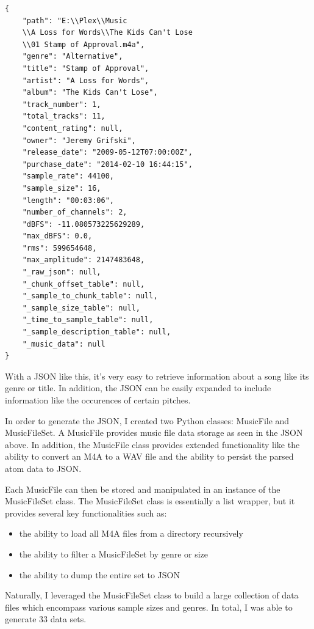 \documentclass[journal]{vgtc}                %
\begin{document}
\begin{verbatim}
{
    "path": "E:\\Plex\\Music
    \\A Loss for Words\\The Kids Can't Lose
    \\01 Stamp of Approval.m4a",
    "genre": "Alternative",
    "title": "Stamp of Approval",
    "artist": "A Loss for Words",
    "album": "The Kids Can't Lose",
    "track_number": 1,
    "total_tracks": 11,
    "content_rating": null,
    "owner": "Jeremy Grifski",
    "release_date": "2009-05-12T07:00:00Z",
    "purchase_date": "2014-02-10 16:44:15",
    "sample_rate": 44100,
    "sample_size": 16,
    "length": "00:03:06",
    "number_of_channels": 2,
    "dBFS": -11.080573225629289,
    "max_dBFS": 0.0,
    "rms": 599654648,
    "max_amplitude": 2147483648,
    "_raw_json": null,
    "_chunk_offset_table": null,
    "_sample_to_chunk_table": null,
    "_sample_size_table": null,
    "_time_to_sample_table": null,
    "_sample_description_table": null,
    "_music_data": null
}
\end{verbatim}

With a JSON like this, it's very easy to retrieve information about a song like
its genre or title. In addition, the JSON can be easily expanded to include
information like the occurences of certain pitches.

In order to generate the JSON, I created two Python classes: MusicFile and
MusicFileSet. A MusicFile provides music file data storage as seen in the JSON
above. In addition, the MusicFile class provides extended functionality like
the ability to convert an M4A to a WAV file and the ability to persist the
parsed atom data to JSON.

Each MusicFile can then be stored and manipulated in an instance of the
MusicFileSet class. The MusicFileSet class is essentially a list wrapper, but
it provides several key functionalities such as:

\begin{itemize}
  \item the ability to load all M4A files from a directory recursively
  \item the ability to filter a MusicFileSet by genre or size
  \item the ability to dump the entire set to JSON
\end{itemize}

Naturally, I leveraged the MusicFileSet class to build a large collection of
data files which encompass various sample sizes and genres. In total, I was
able to generate 33 data sets.
\end{document}
